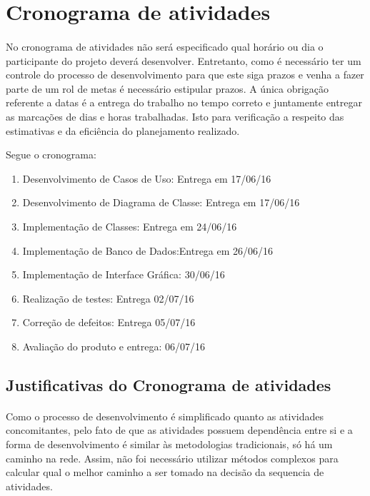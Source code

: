 \documentclass[12pt,a4paper]{article}
\begin{document}
		\section{Cronograma de atividades}
		\paragraph{} No cronograma de atividades não será especificado qual horário ou dia o participante do projeto deverá desenvolver. Entretanto, como é necessário ter um controle do processo de desenvolvimento para que este siga prazos e venha a fazer parte de um rol de metas é necessário estipular prazos. A única obrigação referente a datas é a entrega do trabalho no tempo correto e juntamente entregar as marcações de dias e horas trabalhadas. Isto para verificação a respeito das estimativas e da eficiência do planejamento realizado.
		
		Segue o cronograma: 
		
		\begin{enumerate}
			\item Desenvolvimento de Casos de Uso: Entrega em 17/06/16
			\item Desenvolvimento de Diagrama de Classe: Entrega em 17/06/16
			\item Implementação de Classes: Entrega em 24/06/16
			\item Implementação de Banco de Dados:Entrega em 26/06/16
			\item Implementação de Interface Gráfica: 30/06/16
			\item Realização de testes: Entrega 02/07/16
			\item Correção de defeitos: Entrega 05/07/16
			\item Avaliação do produto e entrega: 06/07/16  
		\end{enumerate}
		
		\subsection{Justificativas do Cronograma de atividades}
		\paragraph{} Como o processo de desenvolvimento é simplificado quanto as atividades concomitantes, pelo fato de que as atividades possuem dependência entre si e a forma de desenvolvimento é similar às metodologias tradicionais, só há um caminho na rede. Assim, não foi necessário utilizar métodos complexos para calcular qual o melhor caminho a ser tomado na decisão da sequencia de atividades.
\end{document}
